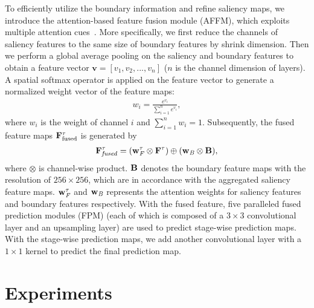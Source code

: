 \documentclass[journal]{IEEEtran}
\begin{document}
To efficiently utilize the boundary information and refine saliency maps, we introduce the attention-based feature fusion module (AFFM), which exploits multiple attention cues~\cite{Chen2017SCA}.
More specifically, we first reduce the channels of saliency features to the same size of boundary features by shrink dimension.
Then we perform a global average pooling on the saliency and boundary features to obtain a feature vector $\textbf{v}=[v_{1},v_{2},...,v_{n}]$ ($n$ is the channel dimension of layers).
A spatial softmax operator is applied on the feature vector to generate a normalized weight vector of the feature maps:
\begin{equation}
\begin{aligned}
{w_{i}}=\frac{e^{v_{i}}}{\sum_{i=1}^{n}e^{v_{i}}},
\label{boundary feature map}
\end{aligned}
\end{equation}
where $w_{i}$ is the weight of channel $i$ and $\sum_{i=1}^{n}w_{i}=1$. Subsequently, the fused feature maps $\bf{F}_{\text{fused}}^{\tau}$ is generated by
\begin{equation}
\begin{aligned}
\bf{F}_{\it{fused}}^{\tau}=(\bf{w}_{\it{F}}^{\tau}\otimes \bf{F}^{\tau}) \oplus (\bf{w}_{\it{B}}\otimes \bf{B}),
\label{equation8}
\end{aligned}
\end{equation}
where $\otimes$ is channel-wise product.
$\bf{B}$ denotes the boundary feature maps with the resolution of $256\times256$, which are in accordance with the aggregated saliency feature maps.
$\bf{w}_{\it{F}}^{\tau}$ and $\bf{w}_{\it{B}}$ represents the attention weights for saliency features and boundary features respectively.
With the fused feature, five paralleled fused prediction modules (FPM) (each of which is composed of a $3\times 3$ convolutional layer and an upsampling layer) are used to predict stage-wise prediction maps.
With the stage-wise prediction maps, we add another convolutional layer with a $1\times1$ kernel to predict the final prediction map.
\section{Experiments}
\label{sec:Experiments}
\end{document}
